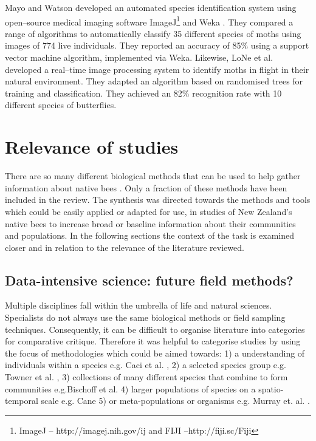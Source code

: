 Mayo and Watson \cite{Mayo2007} developed an automated species identification system using open--source medical imaging software ImageJ\footnote{ImageJ -- {http://imagej.nih.gov/ij} and FIJI --{http://fiji.sc/Fiji}} \cite{Schneider2012} and {Weka} \cite{Hall2009}.  They compared a range of algorithms to automatically classify 35 different species of moths using images of 774 live individuals. They reported an accuracy of 85\% using a support vector machine algorithm, implemented via {Weka}. Likewise, LoNe et al. \cite{Lone2011} developed a real--time image processing system to identify moths in flight in their natural environment. They adapted an algorithm based on randomised trees for training and classification. They achieved an 82\% recognition rate with 10 different species of butterflies.

\section{Relevance of studies}\label{sec:relevance-of-studies}
There are so many different biological methods that can be used to help gather information about native bees \cite{Murray2009}. Only a fraction of these methods have been included in the review. The synthesis was directed towards the methods and tools which could be easily applied or adapted for use, in studies of New Zealand's native bees to increase broad or baseline information about their communities and populations. In the following sections the context of the task is examined closer and in relation to the relevance of the literature reviewed. 

\subsection{Data-intensive science: future field methods?}\label{sec:data-intensive-science:-future-field-methods?}
Multiple disciplines fall within the umbrella of life and natural sciences. Specialists do not always use the same biological methods or field sampling techniques. Consequently, it can be difficult to organise literature into categories for  comparative critique. Therefore it was helpful to categorise studies by using the focus of methodologies which could be aimed towards: 1) a understanding of individuals within a species e.g. Caci et al. \cite{Caci2013}, 2) a selected species group e.g. Towner et al. \cite{Towner2013}, 3) collections of many different species that combine to form communities e.g.Bischoff et al. \cite{Bischoff2003} 4) larger populations of species on a spatio-temporal scale e.g. Cane \cite{Cane2008} 5) or meta-populations or organisms e.g. Murray et. al. \cite{Murray2009}.

